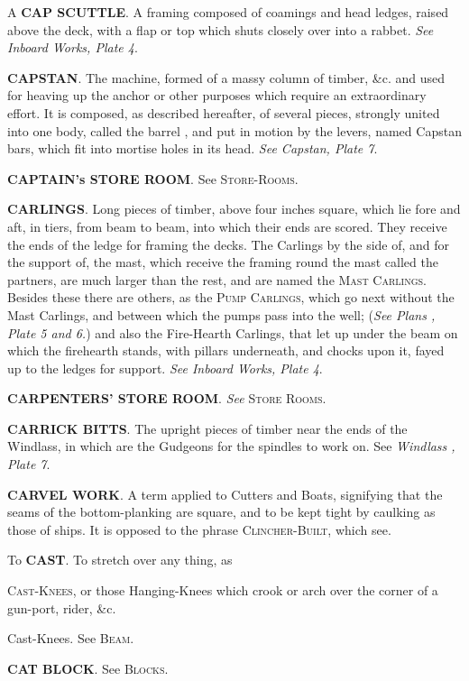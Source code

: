 A \textbf{CAP SCUTTLE}. A framing composed of coamings and head ledges, raised above the deck, with a flap or top which shuts closely over into a rabbet. \textit{See Inboard Works, Plate 4}. 

\textbf{CAPSTAN}. The machine, formed of a massy column of timber, \&c. and used for heaving up the anchor or other purposes which require an extraordinary effort. It is composed, as described hereafter, of several pieces, strongly united into one body, called the barrel , and put in motion by the levers, named Capstan bars, which fit into mortise holes in its head. \textit{See Capstan, Plate 7}. 

\textbf{CAPTAIN's STORE ROOM}. See \textsc{Store-Rooms}. 

\textbf{CARLINGS}. Long pieces of timber, above four inches square, which lie fore and aft, in tiers, from beam to beam, into which their ends are scored. They receive the ends of the ledge for framing the decks. The Carlings by the side of, and for the support of, the mast, which receive the framing round the mast called the partners, are much larger than the rest, and are named the \textsc{Mast Carlings}. Besides these there are others, as the \textsc{Pump Carlings}, which go next without the Mast Carlings, and between which the pumps pass into the well; (\textit{See Plans , Plate 5 and 6.}) and also the Fire-Hearth Carlings, that let up under the beam on which the firehearth stands, with pillars underneath, and chocks upon it, fayed up to the ledges for support. \textit{See Inboard Works, Plate 4}.

\textbf{CARPENTERS' STORE ROOM}. \textit{See} \textsc{Store Rooms}. 

\textbf{CARRICK BITTS}. The upright pieces of timber near the ends of the Windlass, in which are the Gudgeons for the spindles to work on. See \textit{Windlass , Plate 7}. 

\textbf{CARVEL WORK}. A term applied to Cutters and Boats, signifying that the seams of the bottom-planking are square, and to be kept tight by caulking as those of ships. It is opposed to the phrase \textsc{Clincher-Built}, which see. 

To \textbf{CAST}. To stretch over any thing, as 

\textsc{Cast-Knees}, or those Hanging-Knees which crook or arch over the corner of a gun-port, rider, \&c.

Cast-Knees. See \textsc{Beam}. 

\textbf{CAT BLOCK}. See \textsc{Blocks}. 

